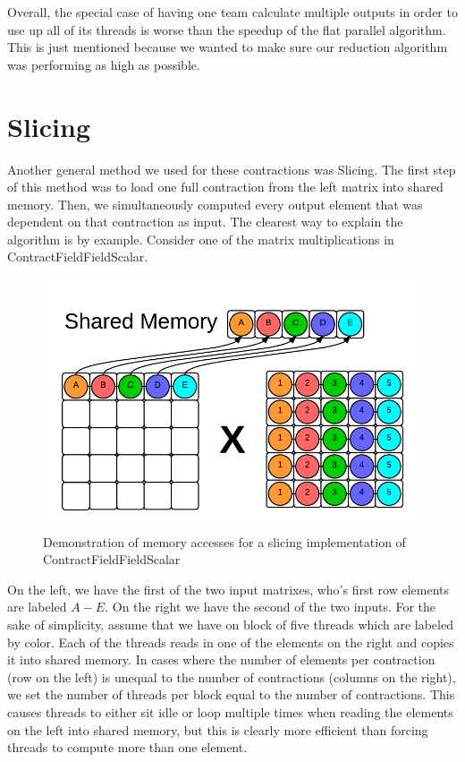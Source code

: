 Overall, the special case of having one team calculate multiple outputs in order to use up all of its threads is worse than the speedup of the flat parallel algorithm. This is just mentioned because we wanted to make sure our reduction algorithm was performing as high as possible. 

\section{Slicing} \label{slicing}
Another general method we used for these contractions was Slicing. The first step of this method was to load one full contraction from the left matrix into shared memory. Then, we simultaneously computed every output element that was dependent on that contraction as input. The clearest way to explain the algorithm is by example. Consider one of the matrix multiplications in ContractFieldFieldScalar. 

\begin{figure}
    \centering
    \includegraphics[scale = .55]{ContractFieldFieldScalarGraphic}
    \caption{Demonstration of memory accesses for a slicing implementation of ContractFieldFieldScalar}
\end{figure}

	On the left, we have the first of the two input matrixes, who's first row elements are labeled $A-E$. On the right we have the second of the two inputs. For the sake of simplicity, assume that we have on block of five threads which are labeled by color. Each of the threads reads in one of the elements on the right and copies it into shared memory. In cases where the number of elements per contraction (row on the left) is unequal to the number of contractions (columns on the right), we set the number of threads per block equal to the number of contractions. This causes threads to either sit idle or loop multiple times when reading the elements on the left into shared memory, but this is clearly more efficient than forcing threads to compute more than one element.
	
